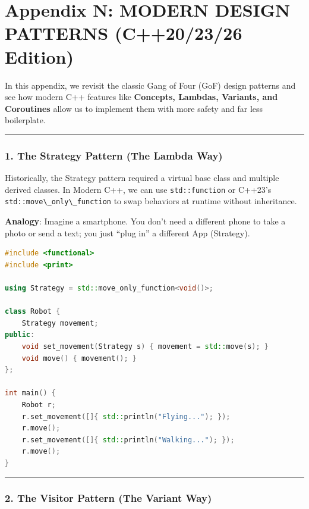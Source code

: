 \hypertarget{appendix-n-modern-design-patterns-c202326-edition}{%
\section{Appendix N: MODERN DESIGN PATTERNS (C++20/23/26
Edition)}\label{appendix-n-modern-design-patterns-c202326-edition}}

In this appendix, we revisit the classic Gang of Four (GoF) design
patterns and see how modern C++ features like \textbf{Concepts, Lambdas,
Variants, and Coroutines} allow us to implement them with more safety
and far less boilerplate.

\begin{center}\rule{0.5\linewidth}{0.5pt}\end{center}

\hypertarget{the-strategy-pattern-the-lambda-way}{%
\subsubsection{1. The Strategy Pattern (The Lambda
Way)}\label{the-strategy-pattern-the-lambda-way}}

Historically, the Strategy pattern required a virtual base class and
multiple derived classes. In Modern C++, we can use
\passthrough{\lstinline!std::function!} or C++23's
\passthrough{\lstinline!std::move\_only\_function!} to swap behaviors at
runtime without inheritance.

\textbf{Analogy}: Imagine a smartphone. You don't need a different phone
to take a photo or send a text; you just ``plug in'' a different App
(Strategy).

\begin{lstlisting}[language={C++}]
#include <functional>
#include <print>

using Strategy = std::move_only_function<void()>;

class Robot {
    Strategy movement;
public:
    void set_movement(Strategy s) { movement = std::move(s); }
    void move() { movement(); }
};

int main() {
    Robot r;
    r.set_movement([]{ std::println("Flying..."); });
    r.move();
    r.set_movement([]{ std::println("Walking..."); });
    r.move();
}
\end{lstlisting}

\begin{center}\rule{0.5\linewidth}{0.5pt}\end{center}

\hypertarget{the-visitor-pattern-the-variant-way}{%
\subsubsection{2. The Visitor Pattern (The Variant
Way)}\label{the-visitor-pattern-the-variant-way}}

